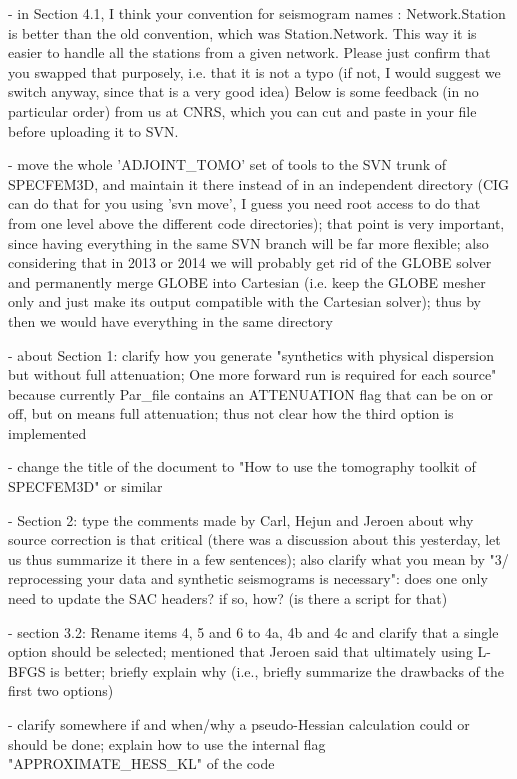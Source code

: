\documentclass[11pt]{article}
\begin{document}
- in Section 4.1, I think your convention for seismogram names : Network.Station is better than the old convention, which was Station.Network. This way it is easier to handle all the stations from a given network. Please just confirm that you swapped that purposely, i.e. that it is not a typo (if not, I would suggest we switch anyway, since that is a very good idea)
Below is some feedback (in no particular order) from us at CNRS, which you can cut and paste in your file before uploading it to SVN.

- move the whole 'ADJOINT\_TOMO' set of tools to the SVN trunk of SPECFEM3D, and maintain it there instead of in an independent directory (CIG can do that for you using 'svn move', I guess you need root access to do that from one level above the different code directories); that point is very important, since having everything in the same SVN branch will be far more flexible; also considering that in 2013 or 2014 we will probably get rid of the GLOBE solver and permanently merge GLOBE into Cartesian (i.e. keep the GLOBE mesher only and just make its output compatible with the Cartesian solver); thus by then we would have everything in the same directory

- about Section 1: clarify how you generate "synthetics with physical dispersion but without full attenuation; One more forward run is required for each source" because currently Par\_file contains an ATTENUATION flag that can be on or off, but on means full attenuation;
thus not clear how the third option is implemented

- change the title of the document to "How to use the tomography toolkit of SPECFEM3D" or similar

- Section 2: type the comments made by Carl, Hejun and Jeroen about why source correction is that critical (there was a discussion about this yesterday, let us thus summarize it there in a few sentences);
also clarify what you mean by "3/ reprocessing your data and synthetic seismograms is necessary": does one only need to update the SAC headers? if so, how? (is there a script for that)

- section 3.2: Rename items 4, 5 and 6 to 4a, 4b and 4c and clarify that a single option should be selected; mentioned that Jeroen said that ultimately using L-BFGS is better; briefly explain why (i.e., briefly summarize the drawbacks of the first two options)

- clarify somewhere if and when/why a pseudo-Hessian calculation could or should be done; explain how to use the internal flag "APPROXIMATE\_HESS\_KL" of the code
\end{document}
